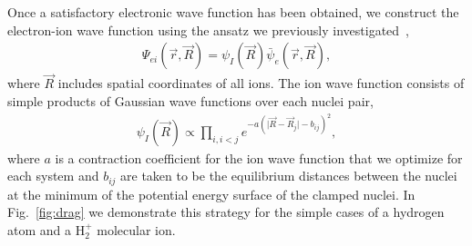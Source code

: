 \documentclass[pra,superscriptaddress,groupedaddress,twocolumn]{revtex4}
\begin{document}
Once a satisfactory electronic wave function has been obtained, we construct the electron-ion wave function using the ansatz we previously investigated~\cite{Tubman_ECG},
\begin{align}
\Psi_{ei}(\vec{r},\vec{R})=\psi_I(\vec{R})\bar{\psi}_e(\vec{r},\vec{R}), \label{eq:psi}
\end{align}
where $\vec{R}$ includes spatial coordinates of all ions. The ion wave function consists of simple products of Gaussian wave functions over each nuclei pair,
\begin{align}
\psi_I(\vec{R})\propto \prod\limits_{i,i<j}e^{-a(\vert \vec{R}-\vec{R}_j\vert-b_{ij})^2},
\label{wfs_ions}
\end{align}
where $a$ is a contraction coefficient for the ion wave function that we optimize for each system and $b_{ij}$ are taken to be the equilibrium distances between the nuclei at the minimum of the potential energy surface of the clamped nuclei. %
In Fig.~\ref{fig:drag} we demonstrate this strategy for the simple cases of a hydrogen atom and a H$_2^+$ molecular ion. %
\end{document}
